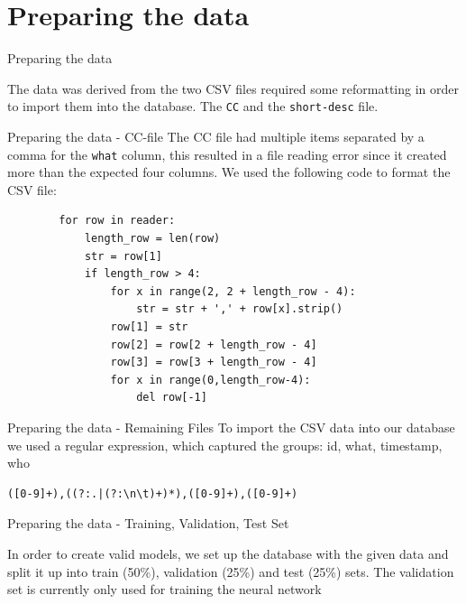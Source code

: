 \documentclass[xcolor=svgnames,handout]{beamer}
\begin{document}
\section{Preparing the data}
\begin{frame}
  {Preparing the data}

The data was derived from the 
two CSV files required some reformatting in order to import them into the database. The \texttt{CC} and the \texttt{short-desc} file.

\end{frame}


\begin{frame}[fragile]
  {Preparing the data - CC-file}
  The CC file had multiple items separated by a comma for the \texttt{what} column, this resulted in a file reading error since it created more than the expected four columns. We used the following code to format the CSV file:
 \begin{verbatim}
        for row in reader:
            length_row = len(row)
            str = row[1]
            if length_row > 4:
                for x in range(2, 2 + length_row - 4):
                    str = str + ',' + row[x].strip()
                row[1] = str
                row[2] = row[2 + length_row - 4]
                row[3] = row[3 + length_row - 4]
                for x in range(0,length_row-4):
                    del row[-1]
 \end{verbatim}
\end{frame}

\begin{frame}[fragile]
  {Preparing the data - Remaining Files}
To import the CSV data into our database we used a regular expression, which captured the groups: id, what, timestamp, who

\bigbreak

\begin{verbatim}
([0-9]+),((?:.|(?:\n\t)+)*),([0-9]+),([0-9]+)
\end{verbatim}


\end{frame}

\begin{frame}
  {Preparing the data - Training, Validation, Test Set}

  In order to create valid models, we set up the database with the given data and split it up into train (50\%), validation (25\%) and test (25\%) sets.
  \bigbreak
  The validation set is currently only used for training the neural network
  
\end{frame}
\end{document}
